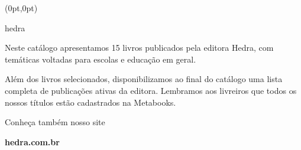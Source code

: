 \begin{textblock*}{5.625in}(0pt,0pt)%
\vspace*{-3cm}
\end{textblock*}

\pagebreak

\pagestyle{indice}

\begin{center}
\newfontfamily{}
{\fontsize{160}{50}\selectfont \timesnewroman hedra}
\end{center}
\vspace{1.2cm}











\hspace*{-7cm}\hrulefill\hspace*{-7cm}

\vspace{1cm}

\hspace*{-.5cm}\parbox{180pt}{\raggedright
Neste catálogo apresentamos 15
livros publicados pela editora Hedra, com temáticas voltadas 
para escolas e educação em geral. 

\vspace{1em}

Além dos livros selecionados, disponibilizamos ao final 
do catálogo uma lista completa de publicações ativas da editora. Lembramos aos 
livreiros que todos os nossos títulos
estão cadastrados na Metabooks.

\vspace{1em}

Conheça também nosso site

\textbf{hedra.com.br}
} %

